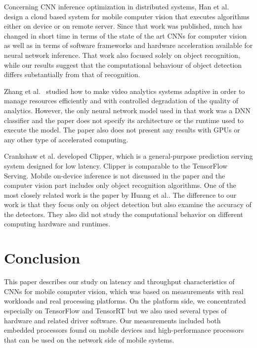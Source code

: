 \documentclass[sigconf]{acmart}
\begin{document}
Concerning CNN inference optimization in distributed systems, Han et al.~\cite{han16mobisys} design a cloud based system for mobile computer vision that executes algorithms either on device or on remote server. Since that work was published, much has changed in short time in terms of the state of the art CNNs for computer vision as well as in terms of software frameworks and hardware acceleration available for neural network inference. That work also focused solely on object recognition, while our results suggest that the computational behaviour of object detection differs substantially from that of recognition. 

Zhang et al.~\cite{zhang17nsdi} studied how to make video analytics systems adaptive in order to manage resources efficiently and with controlled degradation of the quality of analytics. However, the only neural network model used in that work was a DNN classifier and the paper does not specify its architecture or the runtime used to execute the model. The paper also does not present any results with GPUs or any other type of accelerated computing. 

Crankshaw et al.\cite{crankshaw17nsdi} developed Clipper, which is a general-purpose prediction serving system designed for low latency. Clipper is comparable to the TensorFlow Serving.
Mobile on-device inference is not discussed in the paper and the computer vision part includes only object recognition algorithms. One of the most closely related work is the paper by Huang et al.\cite{Huang2017CVPR}. The difference to our work is that they focus only on object detection but also examine the accuracy of the detectors. They also did not study the computational behavior on different computing hardware and runtimes.



\section{Conclusion}
\label{sec:conclusion}

This paper describes our study on latency and throughput characteristics of CNNs for mobile computer vision, which was based on measurements with real workloads and real processing platforms. On the platform side, we concentrated especially on TensorFlow and TensorRT but we also used several types of hardware and related driver software. Our measurements included both embedded processors found on mobile devices and high-performance processors that can be used on the network side of mobile systems.
\end{document}
